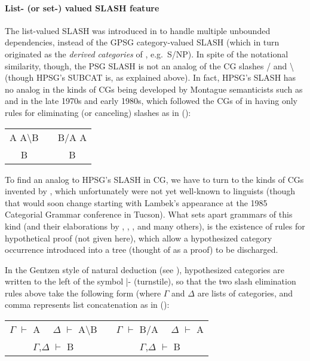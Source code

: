 \documentclass[output=paper]{langsci/langscibook}
\begin{document}
\paragraph*{List- (or set-) valued SLASH feature} The list-valued SLASH was introduced in \citet{Pollard85a-u} to handle multiple unbounded dependencies, instead of the GPSG category-valued SLASH (which in turn originated as the \emph{derived categories} of  \citet{Gazdar81}, e.g.~S/NP). In spite of the notational similarity, though, the PSG SLASH is not an analog of the CG slashes / and \textbackslash (though HPSG's SUBCAT is, as
explained above). In fact, HPSG's SLASH has no analog in the kinds of CGs being developed by Montague semanticists such as \citet{Bach79a,Bach80a} and \citet{Dowty82a-u} in the late 1970s and early 1980s, which followed the CGs of \citet{Bar-Hillel54-u} in having only rules for eliminating (or canceling) slashes as in ():

\ea
\begin{tabular}[t]{ccc}
A A{\textbackslash}B  & &     B/A A \\ \cline{1-1} \cline{3-3}
B & & B 
\end{tabular}
\z

\noindent
To find an analog to HPSG's SLASH in CG, we have to turn to the kinds of CGs invented by \citet{Lambek1958}, which unfortunately were not yet well-known to linguists (though that would soon change starting with Lambek's appearance at the 1985 Categorial Grammar conference in Tucson). What sets apart grammars 
of this kind (and their elaborations by \citet{Moortgat89a-u}, \citet{OBW88a-ed}, \citet{Morrill94a-u}, and many others), is the existence of rules for hypothetical proof (not given here), which allow a hypothesized category occurrence introduced into a tree (thought of as a proof) to be discharged. 

In the Gentzen style of natural deduction (see \citet{Pollard:2013}), hypothesized categories are written to the left of the symbol |- (turnstile), so that the two slash elimination rules above take the following form (where $\Gamma$ and $\Delta$ are  lists of categories, and comma represents list concatenation as in ():

\ea
\begin{tabular}[t]{ccc}
$\Gamma$ $\vdash$ A \ \ $\Delta$ $\vdash$ A{\textbackslash}B  & &     $\Gamma$ $\vdash$ B/A \ \ $\Delta$ $\vdash$ A \\ \cline{1-1} \cline{3-3}
$\Gamma$,$\Delta$ $\vdash$ B & & $\Gamma$,$\Delta$ $\vdash$ B 
\end{tabular}
\z
\end{document}
